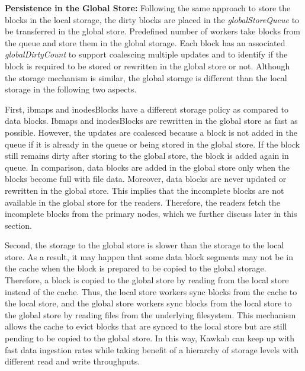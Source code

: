 \documentclass[]{article}
\newcommand{\subtopic}[1]{\vspace{1.5pt} \noindent \textbf{#1}}
\begin{document}



\subtopic{Persistence in the Global Store:} Following the same approach to
store the blocks in the local storage, the dirty blocks are placed in the
\textit{globalStoreQueue} to be transferred in the global store. Predefined
number of workers take blocks from the queue and store them in the
global storage. Each block has an associated \textit{globalDirtyCount}
to support coalescing multiple updates and to identify if the block
is required to be stored or rewritten in the global store or not.
Although the storage mechanism is similar, the global storage is different 
than the local storage in the following two aspects.

First, ibmaps and inodesBlocks have a different storage policy as compared to
data blocks. Ibmaps and inodesBlocks are rewritten in the global store as fast
as possible. However, the updates are coalesced because a block is not added in
the queue if it is already in the queue or being stored in the global store. If
the block still remains dirty after storing to the global store, the block is
added again in queue. In comparison, data blocks are added in the global store
only when the blocks become full with file data.  Moreover, data blocks are
never updated or rewritten in the global store.  This implies that the
incomplete blocks are not available in the global store for the readers.
Therefore, the readers fetch the incomplete blocks from the primary nodes,
which we further discuss later in this section.

Second, the storage to the global store is slower than the storage to the local
store. As a result, it may happen that some data block segments may not be in
the cache when the block is prepared to be copied to the global storage.
Therefore, a block is copied to the global store by reading from the local
store instead of the cache. Thus, the local store workers sync blocks from the
cache to the local store, and the global store workers sync blocks from the
local store to the global store by reading files from the underlying
filesystem. This mechanism allows the cache to evict blocks that are synced to
the local store but are still pending to be copied to the global store.  In
this way, Kawkab can keep up with fast data ingestion rates while taking
benefit of a hierarchy of storage levels with different read and write
throughputs. 
\end{document}
